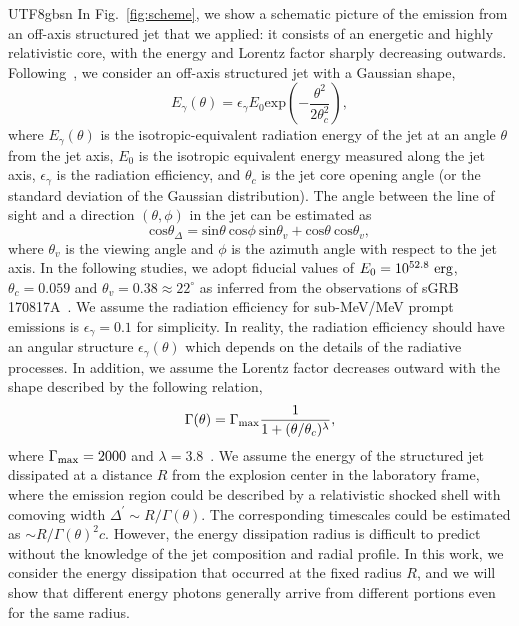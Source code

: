 \documentclass[fleqn,usenatbib]{mnras}
\begin{document}
\begin{CJK*}{UTF8}{gbsn}
In Fig.~\ref{fig:scheme}, we show a schematic picture of the emission from an off-axis structured jet that we applied: it consists of an energetic and highly relativistic core, with the energy and Lorentz factor sharply decreasing outwards.
Following~\cite{Ioka:2019jlj}, we consider an off-axis structured jet with a Gaussian shape,
\begin{equation}\label{eq:Eiso}
    E_\gamma(\theta) = \epsilon_\gamma E_0 \mathrm{exp}\left(-\frac{\theta^2}{2\theta_c^2}\right),
\end{equation}
where $E_\gamma(\theta)$ is the isotropic-equivalent radiation energy of the jet at an angle $\theta$ from the jet axis, $E_0$ is the isotropic equivalent energy measured along the jet axis, $\epsilon_\gamma$ is the radiation efficiency, and $\theta_c$ is the jet core opening angle (or the standard deviation of the Gaussian distribution).
The angle between the line of sight and a direction $(\theta, \phi)$ in the jet 
can be estimated as
\begin{equation}
    \mathrm{cos} \theta_\Delta = \mathrm{sin} \theta ~\mathrm{cos} \phi ~ \mathrm{sin} \theta_v + \mathrm{cos} \theta~\mathrm{cos} \theta_v,
\end{equation}
where $\theta_v$ is the viewing angle and $\phi$ is the azimuth angle with respect to the jet axis. In the following studies, we adopt fiducial values of $E_0 = 10^{52.8}\rm~erg$, $\theta_c = 0.059$ and $\theta_v = 0.38 \approx 22^\circ$ as inferred from the observations of sGRB 170817A~\citep{Troja:2018uns}.
We assume the radiation efficiency for sub-MeV/MeV prompt emissions is $\epsilon_\gamma = 0.1$ for simplicity. In reality, the radiation efficiency should have an angular structure $\epsilon_\gamma (\theta)$ which depends on the details of the radiative processes. In addition, we assume the Lorentz factor decreases outward with the shape described by the following relation,
\begin{equation}
    \Gamma(\theta) = \Gamma_{\rm max} \frac{1}{1 + (\theta/\theta_c)^\lambda},
\end{equation}
where $\Gamma_{\rm max} = 2000$ and $\lambda = 3.8$~\citep{Ioka:2019jlj}. 
We assume the energy of the structured jet dissipated at a distance $R$ from the explosion center in the laboratory frame, 
where the emission region could be described by a relativistic shocked shell with comoving width $\Delta^\prime \sim R / \Gamma (\theta)$. The corresponding timescales could be estimated as $\sim R / \Gamma (\theta)^2 c$.
However, the energy dissipation radius is difficult to predict without the knowledge of the jet composition and radial profile.
In this work, we consider the energy dissipation that occurred at the fixed radius $R$, and we will show that different energy photons generally arrive from different portions even for the same radius. 


\end{CJK*}
\end{document}
